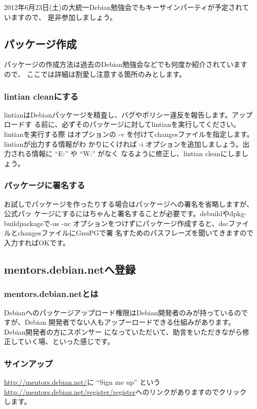 \documentclass[mingoth,a4paper]{jsarticle}
\begin{document}
2012年6月23日(土)の大統一Debian勉強会でもキーサインパーティが予定されていますので、
是非参加しましょう。

\subsection{パッケージ作成}
パッケージの作成方法は過去のDebian勉強会などでも何度か紹介されていますので、
ここでは詳細は割愛し注意する箇所のみとします。

\subsubsection{lintian cleanにする}
lintianはDebianパッケージを精査し、バグやポリシー違反を報告します。アップロードす
る前に、必ずそのパッケージに対してlintianを実行してください。lintianを実行する際
はオプションの -v を付けてchangesファイルを指定します。lintianが出力する情報がわ
かりにくければ -i オプションを追加しましょう。出力される情報に ``E:'' や
``W:'' がなく
なるように修正し、lintian cleanにしましょう。

\subsubsection{パッケージに署名する}
お試しでパッケージを作ったりする場合はパッケージへの署名を省略しますが、公式パッ
ケージにするにはちゃんと署名することが必要です。debuildやdpkg-buildpackageで-us -uc
オプションをつけずにパッケージ作成すると、dscファイルとchangesファイルにGnuPGで署
名すためのパスフレーズを聞いてきますので入力すればOKです。

\subsection{mentors.debian.netへ登録}
\subsubsection{mentors.debian.netとは}
Debianへのパッケージアップロード権限はDebian開発者のみが持っているのですが、Debian
開発者でない人もアップーロードできる仕組みがあります。Debian開発者の方にスポンサー
になっていただいて、助言をいただきながら修正していく場、といった感じです。

\subsubsection{サインアップ}
\url{http://mentors.debian.net/}に ``Sign me up'' という
\url{http://mentors.debian.net/register/register}へのリンクがありますのでクリック
します。
\end{document}
